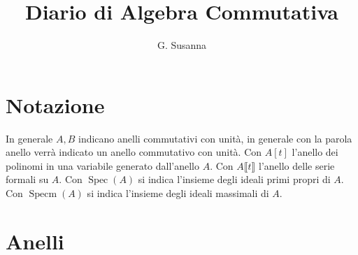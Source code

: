 \documentclass[italian]{article}
\title{Diario di Algebra Commutativa}
\author{G. Susanna}
\date{}
\begin{document}
    \maketitle
    \tableofcontents
    
    \section{Notazione}
    
    In generale $A,B$ indicano anelli commutativi con unità, in generale 
    con la parola anello verrà indicato un anello commutativo con unità.
    Con $A\left[t\right]$ l'anello dei polinomi in una variabile generato 
    dall'anello $A$. Con $A\llbracket t \rrbracket$ l'anello delle serie formali su $A$.
    Con $\operatorname{Spec}(A)$ si indica l'insieme degli ideali primi propri di $A$.
    Con $\operatorname{Specm}(A)$ si indica l'insieme degli ideali massimali di
    $A$.

    \section{Anelli}
    
\end{document}
